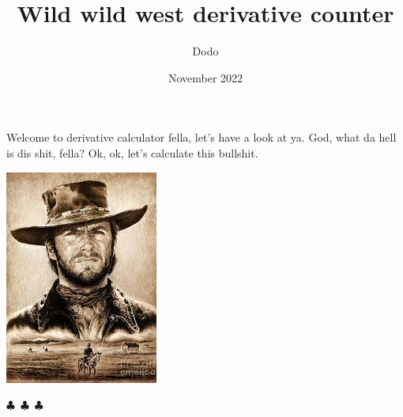 \documentclass{article}
\title{Wild wild west derivative counter}
\author{Dodo}
\date{November 2022}
\begin{document}
    \maketitle
    
        Welcome to derivative calculator fella, let's have a look at ya. God, what da hell is dis shit, fella?
        Ok, ok, let's calculate this bullshit.

        \begin{center}\begin{center} \includegraphics[scale=0.6]{funny_pics/cowboy.jpg} \end{center}\end{center}
        \begin{center}
        $\clubsuit$~$\clubsuit$~$\clubsuit$
        \end{center}
\end{document}
